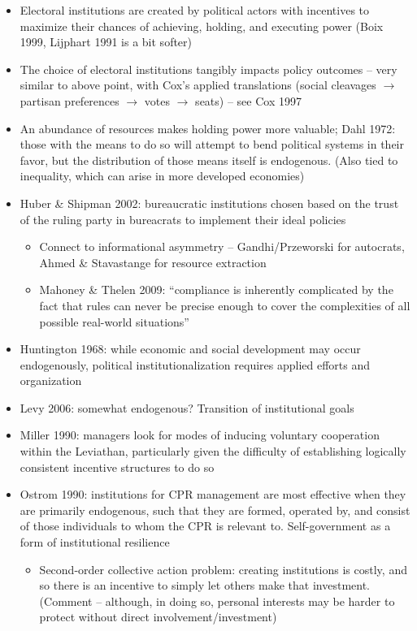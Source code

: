 \documentclass[12pt]{article}
\begin{document}
\begin{itemize}
    \item Electoral institutions are created by political actors with incentives to maximize their chances of achieving, holding, and executing power (Boix 1999, Lijphart 1991 is a bit softer)
    \item The choice of electoral institutions tangibly impacts policy outcomes -- very similar to above point, with Cox's applied translations (social cleavages $\rightarrow$ partisan preferences $\rightarrow$ votes $\rightarrow$ seats) -- see Cox 1997 
    \item An abundance of resources makes holding power more valuable; Dahl 1972: those with the means to do so will attempt to bend political systems in their favor, but the distribution of those means itself is endogenous. (Also tied to inequality, which can arise in more developed economies)
    \item Huber \& Shipman 2002: bureaucratic institutions chosen based on the trust of the ruling party in bureacrats to implement their ideal policies
    \begin{itemize}
        \item Connect to informational asymmetry -- Gandhi/Przeworski for autocrats, Ahmed \& Stavastange for resource extraction
        \item Mahoney \& Thelen 2009: ``compliance is inherently complicated by the fact that rules can never be precise enough to cover the complexities of all possible real-world situations''
    \end{itemize}
    \item Huntington 1968: while economic and social development may occur endogenously, political institutionalization requires applied efforts and organization
    \item Levy 2006: somewhat endogenous? Transition of institutional goals
    \item Miller 1990: managers look for modes of inducing voluntary cooperation within the Leviathan, particularly given the difficulty of establishing logically consistent incentive structures to do so
    \item Ostrom 1990: institutions for CPR management are most effective when they are primarily endogenous, such that they are formed, operated by, and consist of those individuals to whom the CPR is relevant to. Self-government as a form of institutional resilience
    \begin{itemize}
        \item Second-order collective action problem: creating institutions is costly, and so there is an incentive to simply let others make that investment. (Comment -- although, in doing so, personal interests may be harder to protect without direct involvement/investment)

\end{itemize}
\end{itemize}
\end{document}
